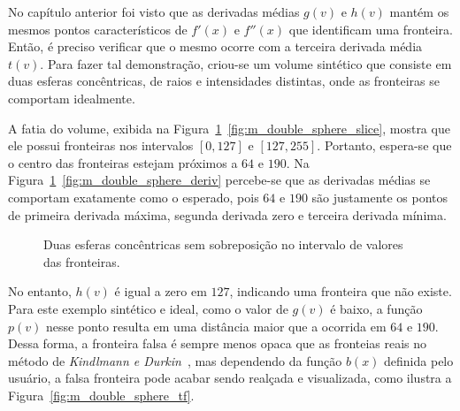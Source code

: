 	No capítulo anterior foi visto que as derivadas médias $ g(v) $ e $ h(v) $ mantém os mesmos pontos característicos de $ f'(x) $ e $ f''(x) $ que identificam uma fronteira. Então, é preciso verificar que o mesmo ocorre com a terceira derivada média $ t(v) $. Para fazer tal demonstração, criou-se um volume sintético que consiste em duas esferas concêntricas, de raios e intensidades distintas, onde as fronteiras se comportam idealmente.
	
	A fatia do volume, exibida na Figura~\ref{fig:m_double_sphere}~\ref{fig:m_double_sphere_slice}, mostra que ele possui fronteiras nos intervalos $ [0,127] $ e $ [127,255] $. Portanto, espera-se que o centro das fronteiras estejam próximos a $ 64 $ e $ 190 $. Na Figura~\ref{fig:m_double_sphere}~\ref{fig:m_double_sphere_deriv} percebe-se que as derivadas médias se comportam exatamente como o esperado, pois $ 64 $ e $ 190 $ são justamente os pontos de primeira derivada máxima, segunda derivada zero e terceira derivada mínima.
	
\begin{figure}[h]
	\centering
	\caption{Duas esferas concêntricas sem sobreposição no intervalo de valores das fronteiras.}
	\label{fig:m_double_sphere}
\end{figure}

	No entanto, $ h(v) $ é igual a zero em $ 127 $, indicando uma fronteira que não existe. Para este exemplo sintético e ideal, como o valor de $ g(v) $ é baixo, a função $ p(v) $ nesse ponto resulta em uma distância maior que a ocorrida em $ 64 $ e $ 190 $. Dessa forma, a fronteira falsa é sempre menos opaca que as fronteias reais no método de \textit{Kindlmann e Durkin}~\cite{gordon}, mas dependendo da função $ b(x) $ definida pelo usuário, a falsa fronteira pode acabar sendo realçada e visualizada, como ilustra a Figura~\ref{fig:m_double_sphere_tf}.
	
